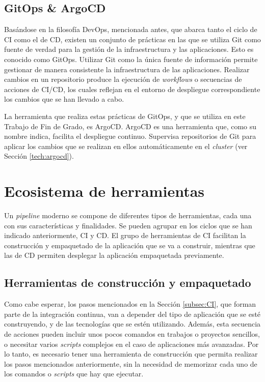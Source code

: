 \subsection*{GitOps \& ArgoCD}

Basándose en la filosofía DevOps, mencionada antes, que abarca tanto el ciclo de CI como el de CD, existen un conjunto de prácticas en las que se utiliza Git como fuente de verdad para la gestión de la infraestructura y las aplicaciones. Esto es conocido como GitOps\cite{gitops}. Utilizar Git como la única fuente de información permite gestionar de manera consistente la infraestructura de las aplicaciones. Realizar cambios en un repositorio produce la ejecución de \textit{workflows} o secuencias de acciones de CI/CD, los cuales reflejan en el entorno de despliegue correspondiente los cambios que se han llevado a cabo.

La herramienta que realiza estas prácticas de GitOps, y que se utiliza en este Trabajo de Fin de Grado, es ArgoCD\cite{argocd}. ArgoCD es una herramienta que, como su nombre indica, facilita el despliegue continuo. Supervisa repositorios de Git para aplicar los cambios que se realizan en ellos automáticamente en el \textit{cluster} (ver Sección \ref{tech:argocd}).

\section{Ecosistema de herramientas}

Un \textit{pipeline} moderno se compone de diferentes tipos de herramientas, cada una con sus características y finalidades. Se pueden agrupar en los ciclos que se han indicado anteriormente, CI y CD. El grupo de herramientas de CI facilitan la construcción y empaquetado de la aplicación que se va a construir, mientras que las de CD permiten desplegar la aplicación empaquetada previamente.

\subsection*{Herramientas de construcción y empaquetado}

Como cabe esperar, los pasos mencionados en la Sección \ref{subsec:CI}, que forman parte de la integración continua, van a depender del tipo de aplicación que se esté construyendo, y de las tecnologías que se estén utilizando. Además, esta secuencia de acciones pueden incluir unos pocos comandos en trabajos o proyectos sencillos, o necesitar varios \textit{scripts} complejos en el caso de aplicaciones más avanzadas. Por lo tanto, es necesario tener una herramienta de construcción que permita realizar los pasos mencionados anteriormente, sin la necesidad de memorizar cada uno de los comandos o \textit{scripts} que hay que ejecutar.

